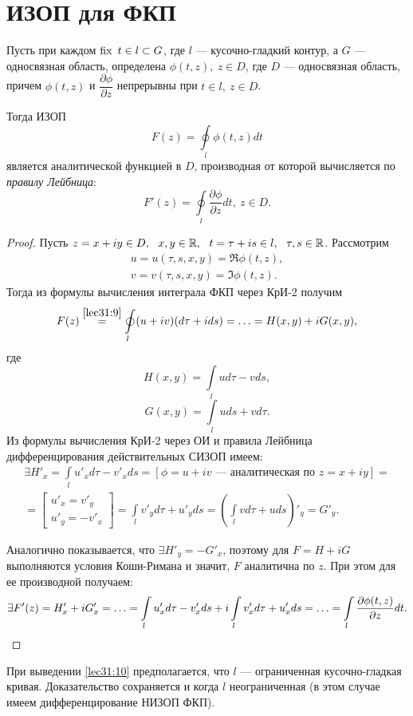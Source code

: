 \documentclass[../../main.tex]{subfiles}
\begin{document}
\section{ИЗОП для ФКП}
\begin{thm}
    Пусть при каждом $\operatorname{fix} \ t \in l \subset G$, где $l$ --- кусочно-гладкий
    контур, а $G$ --- односвязная область, определена $ \phi(t, z), \
    z \in D $, где $D$ --- односвязная область, причем
    $\phi(t, z)$ и $\dfrac{\partial \phi}{\partial z}$ непрерывны при
    $t \in l, \ z \in D$.
    
    Тогда ИЗОП
    \begin{equation}
        \label{lec31:9}
        F(z) = \oint\limits_{l} \phi(t, z) dt
    \end{equation}
    является аналитической функцией в $D$, производная от которой вычисляется
    по \emph{правилу Лейбница}:
    \begin{equation}
        \label{lec31:10}
        F'(z) = \oint\limits_{l} \dfrac{\partial \phi}{\partial z} dt,
        \ z \in D.
    \end{equation}
\end{thm}
\begin{proof}
    Пусть $z = x + i y \in D, \ \ x, y \in \R, \ \ t = \tau + i s \in l,
    \ \ \tau, s \in \R$. Рассмотрим \[ \begin{gathered}
    u = u(\tau, s, x, y) = \Re \phi(t, z), \\
    v = v(\tau, s, x, y) = \Im \phi(t, z).
    \end{gathered} \]
    Тогда из формулы вычисления интеграла ФКП через КрИ-2 получим
    \[ F(z) \stackrel{\eqref{lec31:9}}{=} \oint\limits_{l} (u + i v)
    (d \tau + i d s) = \ldots = H(x, y) + i G(x, y),\]
    где
    \[ H(x, y) = \int\limits_{l} u d \tau - v d s, \]
    \[ G(x, y) = \int\limits_{l} u d s + v d \tau. \]
    Из формулы вычисления КрИ-2 через ОИ и правила Лейбница
    дифференцирования действительных СИЗОП имеем:
    \[ \begin{gathered} 
        \exists H'_x = \int\limits_{l} u'_x d \tau - v'_x d s =
        [ \phi = u + i v \text{~--- аналитическая по } z = x + i y ]
        = \\ =
        \left[\begin{gathered}
            u'_x = v'_y \\
            u'_y = - v'_x
        \end{gathered}\right] =
        \int\limits_{l} v'_y d \tau + u'_y d s =
        \left(\int\limits_{l} v d \tau + u d s\right)'_y = G'_y.
    \end{gathered} \]

    Аналогично показывается, что $\exists H'_y = -G'_x$, поэтому для
    $ F = H + i G $
    выполняются условия Коши-Римана и значит, $F$ аналитична по $z$.
    При этом для ее производной получаем:
    \[\begin{gathered}
        \exists F'(z) = H'_x + i G'_x = \ldots =
        \int\limits_{l} u'_x d \tau - v'_x d s + 
        i \int\limits_{l} v'_x d \tau + u'_x d s = \ldots =
        \int\limits_{l} \dfrac{\partial \phi (t, z)}{\partial z} dt. \qedhere
    \end{gathered}\] 
\end{proof}
\begin{rem}
    При выведении \eqref{lec31:10} предполагается, что $l$ ---
    ограниченная кусочно-гладкая кривая. Доказательство сохраняется
    и когда $l$ неограниченная (в этом случае имеем дифференцирование НИЗОП
    ФКП).
\end{rem}
\end{document}
